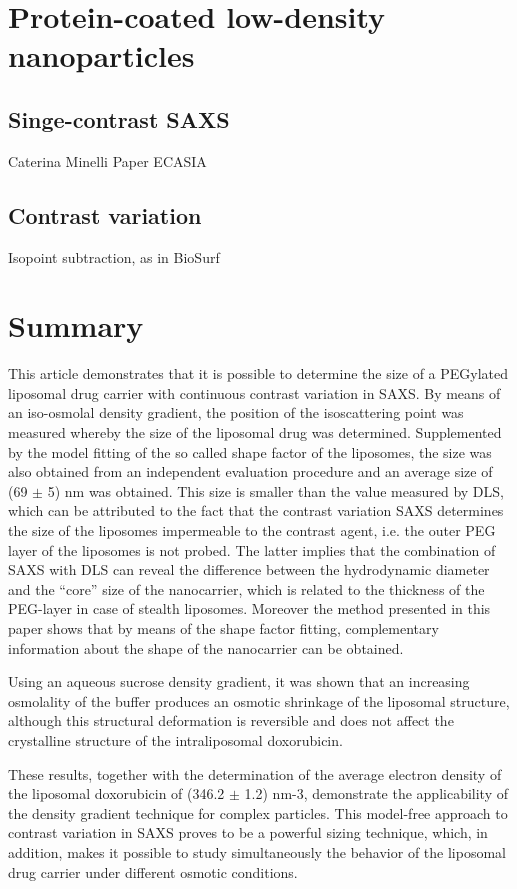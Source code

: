\section{Protein-coated low-density nanoparticles}
\subsection{Singe-contrast SAXS}
Caterina Minelli Paper ECASIA
\subsection{Contrast variation}
Isopoint subtraction, as in BioSurf

\section{Summary}
This article demonstrates that it is possible to determine the size of a PEGylated liposomal drug carrier with continuous contrast variation in SAXS. By means of an iso-osmolal density gradient, the position of the isoscattering point was measured whereby the size of the liposomal drug was determined. Supplemented by the model fitting of the so called shape factor of the liposomes, the size was also obtained from an independent evaluation procedure and an average size of (69 $\pm$ 5) nm was obtained. This size is smaller than the value measured by DLS, which can be attributed to the fact that the contrast variation SAXS determines the size of the liposomes impermeable to the contrast agent, i.e. the outer PEG layer of the liposomes is not probed. The latter implies that the combination of SAXS with DLS can reveal the difference between the hydrodynamic diameter and the “core” size of the nanocarrier, which is related to the thickness of the PEG-layer in case of stealth liposomes. Moreover the method presented in this paper shows that by means of the shape factor fitting, complementary information about the shape of the nanocarrier can be obtained.

Using an aqueous sucrose density gradient, it was shown that an increasing osmolality of the buffer produces an osmotic shrinkage of the liposomal structure, although this structural deformation is reversible and does not affect the crystalline structure of the intraliposomal doxorubicin.

These results, together with the determination of the average electron density of the liposomal doxorubicin of (346.2 $\pm$ 1.2) nm-3, demonstrate the applicability of the density gradient technique for complex particles. This model-free approach to contrast variation in SAXS proves to be a powerful sizing technique, which, in addition, makes it possible to study simultaneously the behavior of the liposomal drug carrier under different osmotic conditions.



